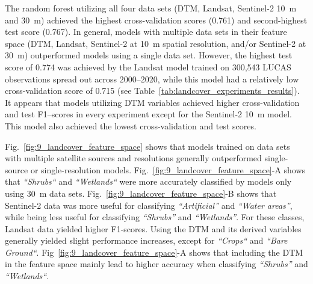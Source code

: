 The random forest utilizing all four data sets (DTM, Landsat, Sentinel-2 10~m and 30~m) achieved the highest cross-validation scores (0.761) and second-highest test score (0.767). In general, models with multiple data sets in their feature space (DTM, Landsat, Sentinel-2 at 10~m spatial resolution, and/or Sentinel-2 at 30~m) outperformed models using a single data set. However, the highest test score of 0.774 was achieved by the Landsat model trained on 300,543 LUCAS observations spread out across 2000--2020, while this model had a relatively low cross-validation score of 0.715 (see Table~\ref{tab:landcover_experiments_results}). It appears that models utilizing DTM variables achieved higher cross-validation and test F1--scores in every experiment except for the Sentinel-2 10~m model. This model also achieved the lowest cross-validation and test scores. 

Fig.\@~\ref{fig:9_landcover_feature_space} shows that models trained on data sets with multiple satellite sources and resolutions generally outperformed single-source or single-resolution models. Fig.\@~\ref{fig:9_landcover_feature_space}-A shows that \emph{``Shrubs``} and \emph{``Wetlands``} were more accurately classified by models only using 30~m data sets.  Fig.\@~\ref{fig:9_landcover_feature_space}-B shows that Sentinel-2 data was more useful for classifying \emph{``Artificial''} and \emph{``Water areas''}, while being less useful for classifying \emph{``Shrubs''} and \emph{``Wetlands''}. For these classes, Landsat data yielded higher F1-scores. Using the DTM and its derived variables generally yielded slight performance increases, except for \emph{``Crops``} and \emph{``Bare Ground``}. Fig\@~\ref{fig:9_landcover_feature_space}-A shows that including the DTM in the feature space mainly lead to higher accuracy when classifying \emph{``Shrubs''} and \emph{``Wetlands``}.

